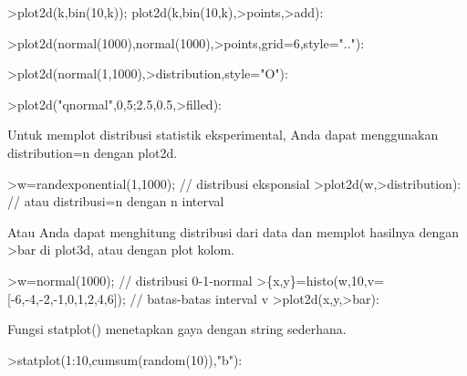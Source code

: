 \documentclass[12pt,arial,letterpaper]{book}
\begin{document}
\begin{eulernootebook}
\begin{eulercomment}
\begin{eulercomment}
\begin{eulernootebook}
\begin{eulercomment}
\begin{eulercomment}
\begin{eulercomment}
\begin{eulercomment}
\begin{eulercomment}
\begin{eulercomment}
\begin{eulercomment}
\begin{eulernotebook}
\begin{eulercomment}
\begin{eulercomment}
\begin{eulercomment}
\begin{eulercomment}
\begin{eulerprompt}
>plot2d(k,bin(10,k)); plot2d(k,bin(10,k),>points,>add):
\end{eulerprompt}
\begin{eulerprompt}
>plot2d(normal(1000),normal(1000),>points,grid=6,style=".."):
\end{eulerprompt}
\begin{eulerprompt}
>plot2d(normal(1,1000),>distribution,style="O"):
\end{eulerprompt}
\begin{eulerprompt}
>plot2d("qnormal",0,5;2.5,0.5,>filled):
\end{eulerprompt}
\begin{eulercomment}
Untuk memplot distribusi statistik eksperimental, Anda dapat
menggunakan distribution=n dengan plot2d.
\end{eulercomment}
\begin{eulerprompt}
>w=randexponential(1,1000); // distribusi eksponsial
>plot2d(w,>distribution): // atau distribusi=n dengan n interval 
\end{eulerprompt}
\begin{eulercomment}
Atau Anda dapat menghitung distribusi dari data dan memplot hasilnya
dengan \textgreater{}bar di plot3d, atau dengan plot kolom.
\end{eulercomment}
\begin{eulerprompt}
>w=normal(1000); // distribusi 0-1-normal
>\{x,y\}=histo(w,10,v=[-6,-4,-2,-1,0,1,2,4,6]); // batas-batas interval v
>plot2d(x,y,>bar):
\end{eulerprompt}
\begin{eulercomment}
Fungsi statplot() menetapkan gaya dengan string sederhana.
\end{eulercomment}
\begin{eulerprompt}
>statplot(1:10,cumsum(random(10)),"b"):
\end{eulerprompt}

\end{eulercomment}
\end{eulercomment}
\end{eulercomment}
\end{eulercomment}
\end{eulernotebook}
\end{eulercomment}
\end{eulercomment}
\end{eulercomment}
\end{eulercomment}
\end{eulercomment}
\end{eulercomment}
\end{eulercomment}
\end{eulernootebook}
\end{eulercomment}
\end{eulercomment}
\end{eulernootebook}
\end{document}

